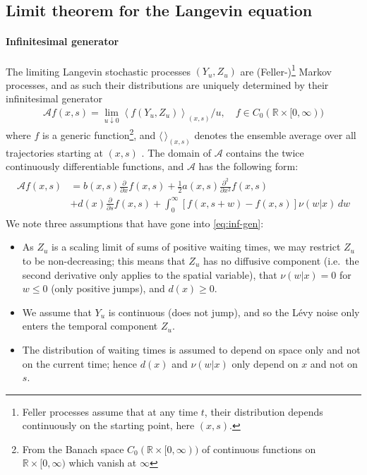 \documentclass[a4paper,12pt]{elsarticle}
\numberwithin{equation}{section}
\theoremstyle{plain}
\theoremstyle{definition}
\theoremstyle{remark}
\numberwithin{equation}{section}
\newcommand{\spc}{\mathbb R}
\newcommand{\spctim}{\spc \times [0,\infty)}
\newcommand{\1}{\mathbf 1}
\newcommand{\del}{\partial}
\begin{document}
\subsection{Limit theorem for the Langevin equation}
\label{subsec:convergence}
\paragraph{Infinitesimal generator}
The limiting Langevin stochastic processes $(Y_u,Z_u)$ are (Feller-)\footnote{Feller processes assume that at any time $t$, their distribution depends continuously on the starting point, here $(x,s)$.} Markov
processes, and as such their distributions
are uniquely determined by their infinitesimal generator
\begin{align}
\mathcal A f(x,s) = \lim_{u \downarrow 0}
\left \langle f(Y_u, Z_u)\right \rangle_{(x,s)} / u, 
\quad f \in C_0(\spctim)
\end{align}
where $f$ is a generic function\footnote{From the Banach space
$C_0(\spctim)$ of continuous  functions on $\spctim$ which vanish at $\infty$},
and $\langle \, \rangle_{(x,s)}$ denotes the ensemble average over all
trajectories starting at $(x,s)$ \citep{Applebaum}. The domain of $\mathcal A$ contains the twice
continuously differentiable functions, and $\mathcal A$ has the following
form:
\begin{align} \label{eq:inf-gen}
\begin{split}
\mathcal A f(x,s)
&= b(x,s)\frac{\del }{\del x} f(x,s)
+\frac{1}{2} a(x,s) \frac{\del^2}{\del x^2} f(x,s)\\
&+ d(x) \frac{\partial}{\partial s} f(x,s)
+ \int_0^\infty \left[f(x,s+w)-f(x,s)
\right] \nu(w|x)\, dw
\end{split}
\end{align}
We note three assumptions that have gone into \eqref{eq:inf-gen}: 
\begin{itemize}
\item
As $Z_u$ is a scaling limit of sums of positive waiting times,
we may restrict $Z_u$ to be non-decreasing; this means that
$Z_u$ has no diffusive component (i.e.\ the second derivative only applies to 
the spatial variable), that $\nu(w|x) = 0$ for $w \le 0$
(only positive jumps), and $d(x) \ge 0$.
\item
We assume that $Y_u$ is continuous (does not jump),
and so the L\'evy noise only enters the temporal component $Z_u$.
\item
The distribution of waiting times is assumed to depend on space only and not
on the current time; hence $d(x)$ and $\nu(w|x)$ only depend on $x$ and not on $s$.
\end{itemize}
\end{document}
